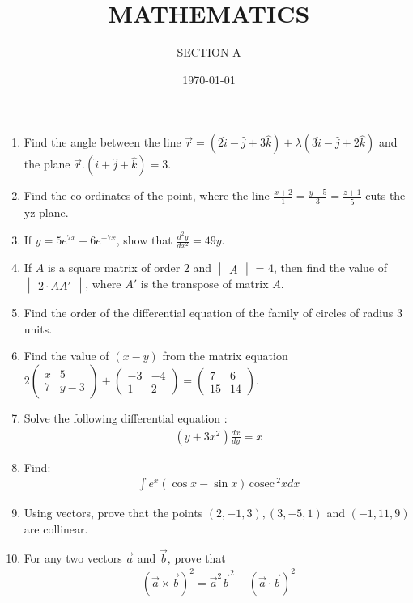 \documentclass[10pt,-letter paper]{article}
\title{MATHEMATICS}
\author{SECTION A}
\date{\today}
\providecommand{\brak}[1]{\ensuremath{\left(#1\right)}}
\newcommand{\cosec}{\,\text{cosec}\,}
\newcommand{\myvec}[1]{\ensuremath{\begin{pmatrix}#1\end{pmatrix}}}
\newcommand{\mydet}[1]{\ensuremath{\begin{vmatrix}#1\end{vmatrix}}}
\begin{document}
\maketitle

\begin{enumerate}

\item Find the angle between the line $\overrightarrow{r}=\brak{2\hat{i}-\hat{j}+3\hat{k}}+\lambda\brak{3\hat{i}-\hat{j}+2\hat{k}}$ and the plane $\overrightarrow{r}.\brak{\hat{i}+\hat{j}+\hat{k}}=3$.

\item Find the co-ordinates of the point, where the line $\frac{x+2}{1}=\frac{y-5}{3}=\frac{z+1}{5}$ cuts the yz-plane.

\item If $y=5e^{7x}+6e^{-7x}$, show that $\frac{d^2{y}}{d{x^2}}=49y$.

\item If $A$ is a square matrix of order $2$ and $\mydet{A}$ = $4$, then find the value of $\mydet{2\cdot AA'}$, where $A'$ is the transpose of matrix $A$.

\item Find the order of the differential equation of the family of circles of radius $3$ units.

\item Find the value of $\brak{x-y}$ from the matrix equation $2\myvec{x & 5 \\ 7 & y-3} + \myvec{-3 & -4 \\ 1 & 2}= \myvec{7 & 6 \\ 15 & 14}$.

\item Solve the following differential equation :
\begin{align*}\brak{y + 3x^{2}}\frac{dx}{dy}=x
\end{align*}

\item Find:
\begin{align*}\int e^x\brak{\cos x-\sin x}\cosec^2 x dx
\end{align*}

\item Using vectors, prove that the points $\brak{2,-1,3},\brak{3,-5,1}$ and $\brak{-1,11,9}$ are collinear.

\item For any two vectors $\overrightarrow{a}$ and $\overrightarrow{b}$, prove that\begin{align*}\brak{{\overrightarrow{a} \times \overrightarrow{b}}}^2 =\overrightarrow{a}^2\overrightarrow{b}^2 - \brak{{\overrightarrow{a} \cdot \overrightarrow{b}}}^2\end{align*}


\end{enumerate}
\end{document}
